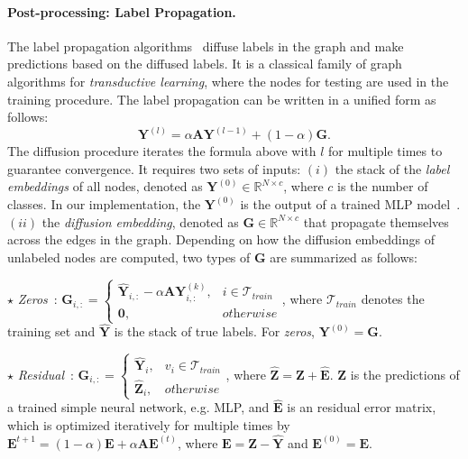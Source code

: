 \message{ !name(main.tex)}\documentclass{article}
\newcommand{\bm}[1]{\mathbf{#1}}
\begin{document}
\paragraph{Post-processing: Label Propagation.}
The label propagation algorithms~\citep{zhu2005semi, wang2007label, karasuyama2013manifold, gong2016label, liu2018learning, huang2020combining, wang2020unifying} diffuse labels in the graph and make predictions based on the diffused labels. It is a classical family of graph algorithms for \textit{transductive learning}, where the nodes for testing are used in the training procedure. The label propagation can be written in a unified form as follows:
\begin{equation}\label{equ:lp}
	\bm{Y}^{(l)} = \alpha \bm{A}\bm{Y}^{(l-1)} + (1-\alpha) \bm{G}.
\end{equation}
The diffusion procedure iterates the formula above with $l$ for multiple times to guarantee convergence. It requires two sets of inputs: \((i)\) the stack of the \textit{label embeddings} of all nodes, denoted as $\bm{Y}^{(0)}\in \mathbb{R}^{N\times c}$, where \(c\) is the number of classes. In our implementation, the $\bm{Y}^{(0)}$ is the output of a trained MLP model~\cite{huang2020combining}. \((ii)\) the \textit{diffusion embedding}, denoted as $\mathbf{G} \in \mathbb{R}^{N\times c}$ that propagate themselves across the edges in the graph. Depending on how the diffusion embeddings of unlabeled nodes are computed, two types of $\bm{G}$ are summarized as follows:



\(\star\) \textit{Zeros}~\citep{zhu2005semi}:
\(\mathbf{G}_{i,:} =
\begin{cases}
	\hat{\mathbf{Y}}_{i,:}-\alpha\bm{A}\bm{Y}_{i,:}^{(k)}, & i \in \mathcal{T}_{train} \\
	\mathbf{0},                                            & \textit{otherwise}
\end{cases}\), where \(\mathcal{T}_{train}\) denotes the training set and \(\hat{\mathbf{Y}}\) is the stack of true labels. For \textit{zeros}, \(\mathbf{Y}^{(0)}=\mathbf{G}\).

\(\star\) \textit{Residual}~\citep{huang2020combining}:
\(\mathbf{G}_{i,:} =
\begin{cases}
	\hat{\mathbf{Y}}_i, & v_i \in \mathcal{T}_{\textit{train}} \\
	\hat{\mathbf{Z}}_i, & \textit{otherwise}
\end{cases}\), where \(\hat{\mathbf{Z}}=\mathbf{Z}+\hat{\mathbf{E}}\). $\mathbf{Z}$ is the predictions of a trained simple neural network, e.g. MLP, and \(\hat{\mathbf{E}}\) is an residual error matrix, which is optimized iteratively for multiple times by \(\mathbf{E}^{t+1}=(1-\alpha)\mathbf{E}+\alpha \mathbf{A}\mathbf{E}^{(t)}\), where \(\mathbf{E}=\mathbf{Z}-\hat{\mathbf{Y}}\) and \(\mathbf{E}^{(0)}=\mathbf{E}\).
\end{document}

